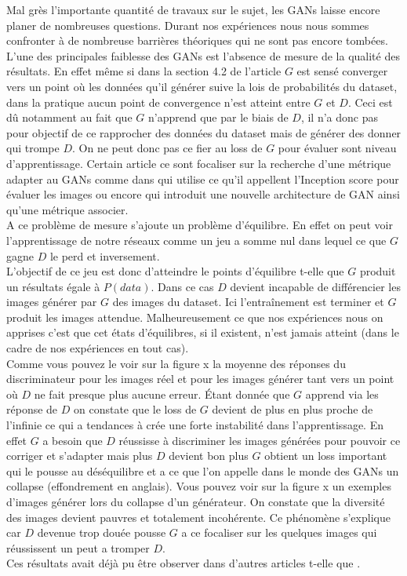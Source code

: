 \documentclass[11pt,francais]{article}
\begin{document}
Mal grès l'importante quantité de travaux sur le sujet, les GANs laisse encore planer de nombreuses questions.
Durant nos expériences nous nous sommes confronter à de nombreuse barrières théoriques qui ne sont pas encore tombées. 
L'une des principales faiblesse des GANs est l'absence de mesure de la qualité des résultats. En effet même si dans la section 4.2 de l'article \cite{NIPS2014_5423} \(G\) est sensé converger vers un point où les données qu'il générer suive la lois de probabilités du dataset, dans la pratique aucun point de convergence n'est atteint entre \(G\) et \(D\). Ceci est dû notamment au fait que \(G\) n'apprend que par le biais de \(D\), il n'a donc pas pour objectif de ce rapprocher des données du dataset mais de générer des donner qui trompe \(D\). On ne peut donc pas ce fier au loss de \(G\) pour évaluer sont niveau d'apprentissage.
Certain article ce sont focaliser sur la recherche d'une métrique adapter au GANs comme dans \cite{salimans2016improved} qui utilise ce qu'il appellent l'Inception score pour évaluer les images ou encore \cite{berthelot2017began} qui introduit une nouvelle architecture de GAN ainsi qu'une métrique associer.\\
A ce problème de mesure s'ajoute un problème d'équilibre.
En effet on peut voir l'apprentissage de notre réseaux comme un jeu a somme nul dans lequel ce que \(G\) gagne \(D\) le perd et inversement.\\
L'objectif de ce jeu est donc d'atteindre le points d'équilibre t-elle que \(G\) produit un résultats égale à \(P(data)\). Dans ce cas \(D\) devient incapable de différencier les images générer par \(G\) des images du dataset. Ici l'entraînement est terminer et \(G\) produit les images attendue.
Malheureusement ce que nos expériences nous on apprises c'est que cet états d'équilibres, si il existent, n'est jamais atteint (dans le cadre de nos expériences en tout cas).\\
Comme vous pouvez le voir sur la figure x la moyenne des réponses du discriminateur pour les images réel et pour les images générer tant vers un point où \(D\) ne fait presque plus aucune erreur. Étant donnée que \(G\) apprend via les réponse de \(D\) on constate que le loss de \(G\) devient de plus en plus proche de l'infinie ce qui a tendances à crée une forte instabilité dans l'apprentissage. 
En effet \(G\) a besoin que \(D\) réussisse à discriminer les images générées pour pouvoir ce corriger et s'adapter mais plus \(D\) devient bon plus \(G\) obtient un loss important qui le pousse au déséquilibre et a ce que l'on appelle dans le monde des GANs un collapse (effondrement en anglais). Vous pouvez voir sur la figure x un exemples d'images générer lors du collapse d'un générateur. On constate que la diversité des images devient pauvres et totalement incohérente. Ce phénomène s'explique car \(D\) devenue trop douée pousse \(G\) a ce focaliser sur les quelques images qui réussissent un peut a tromper \(D\).\\ 
Ces résultats avait déjà pu être observer dans d'autres articles t-elle que \cite{NIPS2014_5423}.
\end{document}
